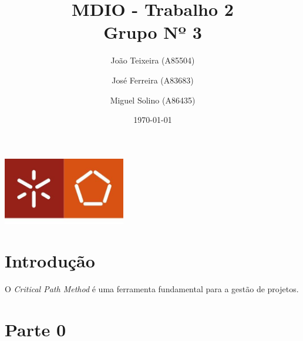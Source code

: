 \documentclass[a4paper]{report}
\begin{document}
\title{MDIO - Trabalho 2\\ 
\large Grupo Nº 3}
\author{João Teixeira (A85504) \and José Ferreira (A83683) \and Miguel Solino (A86435)}
\date{\today}

\begin{center}
    \begin{minipage}{0.75\linewidth}
        \centering
        \includegraphics[width=0.4\textwidth]{images/eng.jpeg}\par\vspace{1cm}
        \vspace{1.5cm}
        \href{https://www.uminho.pt/PT}
        {\color{black}{\scshape\LARGE Universidade do Minho}} \par
        \vspace{1cm}
        \href{https://www.di.uminho.pt/}
        {\color{black}{\scshape\Large Departamento de Informática}} \par
        \vspace{1.5cm}
        \maketitle
    \end{minipage}
\end{center}

\tableofcontents

\pagebreak

\chapter{Introdução}
O \textit{Critical Path Method} é uma ferramenta fundamental para a gestão de
projetos.

\chapter{Parte 0}
\end{document}
